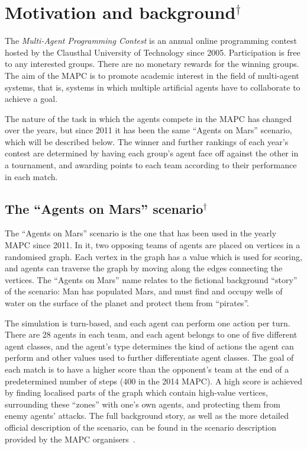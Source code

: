 \section{Motivation and background$^\dagger$}
The \emph{Multi-Agent Programming Contest} is an annual online programming contest hosted by the Clausthal University of Technology since 2005.
Participation is free to any interested groups.
There are no monetary rewards for the winning groups.
The aim of the MAPC is to promote academic interest in the field  of multi-agent systems, that is, systems in which multiple artificial agents have to collaborate to achieve a goal.

The nature of the task in which the agents compete in the MAPC has changed over the years, but since 2011 it has been the same \enquote{Agents on Mars} scenario, which will be described below.
The winner and further rankings of each year's contest are determined by having each group's agent face off against the other in a tournament, and awarding points to each team according to their performance in each match.

\subsection{The \enquote{Agents on Mars} scenario$^\dagger$}
The \enquote{Agents on Mars} scenario is the one that has been used in the yearly MAPC since 2011.
In it, two opposing teams of agents are placed on vertices in a randomised graph.
Each vertex in the graph has a value which is used for scoring, and agents can traverse the graph by moving along the edges connecting the vertices.
The \enquote{Agents on Mars} name relates to the fictional background \enquote{story} of the scenario: Man has populated Mars, and must find and occupy wells of water on the surface of the planet and protect them from \enquote{pirates}.

The simulation is turn-based, and each agent can perform one action per turn.
There are 28 agents in each team, and each agent belongs to one of five different agent classes, and the agent's type determines the kind of actions the agent can perform and other values used to further differentiate agent classes.
The goal of each match is to have a higher score than the opponent's team at the end of a predetermined number of steps (400 in the 2014 MAPC).
A high score is achieved by finding localised parts of the graph which contain high-value vertices, surrounding these \enquote{zones} with one's own agents, and protecting them from enemy agents' attacks.
The full background story, as well as the more detailed official description of the scenario, can be found in the scenario description provided by the MAPC organisers~\cite{ahlbrecht_mapc_2014}.

